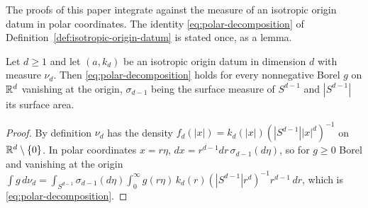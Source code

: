 The proofs of this paper integrate against the \Levy{} measure of an isotropic origin datum in
polar coordinates. The identity \ref{eq:polar-decomposition} of
Definition~\ref{def:isotropic-origin-datum} is stated once, as a lemma.

\begin{lemma}\label{lem:polar-decomposition}
Let $d \ge 1$ and let $(a, k_d)$ be an isotropic origin datum in dimension $d$ with \Levy{} measure
$\nu_d$. Then \ref{eq:polar-decomposition} holds for every nonnegative Borel $g$ on $\mathbb{R}^d$
vanishing at the origin, $\sigma_{d-1}$ being the surface measure of $S^{d-1}$ and $|S^{d-1}|$ its
surface area.
\end{lemma}

\begin{proof}
By definition $\nu_d$ has the density $f_d(|x|) = k_d(|x|)(|S^{d-1}||x|^d)^{-1}$ on
$\mathbb{R}^d \setminus \{0\}$. In polar coordinates $x = r\eta$, $dx = r^{d-1}dr\,\sigma_{d-1}(d\eta)$, so
for $g \ge 0$ Borel and vanishing at the origin
$\int g\,d\nu_d = \int_{S^{d-1}}\sigma_{d-1}(d\eta)\int_0^\infty g(r\eta)\,
k_d(r)(|S^{d-1}|r^d)^{-1}r^{d-1}\,dr$, which is \ref{eq:polar-decomposition}.
\end{proof}

